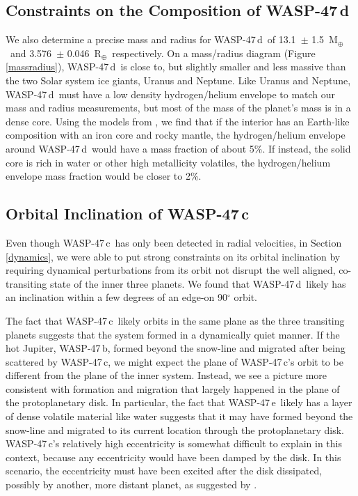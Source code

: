 \documentclass{emulateapj}
\newcommand{\Spitzer}{{\it Spitzer}}
\newcommand{\thisfirstplanet}{WASP-47\,b}
\newcommand{\thissecondplanet}{WASP-47\,e}
\newcommand{\thisthirdplanet}{WASP-47\,d}
\newcommand{\thisfourthplanet}{WASP-47\,c}
\newcommand{\mearth}{M$_\oplus$}
\newcommand{\rearth}{R$_\oplus$}
\newcommand{\rpld}{3.576}
\newcommand{\urpld}{0.046}
\newcommand{\mpld}{13.1}
\newcommand{\umpld}{1.5}
\begin{document}

\subsection{Constraints on the Composition of \thisthirdplanet}

We also determine a precise mass and radius for \thisthirdplanet\ of \mpld\ $\pm$ \umpld\ \mearth\ and \rpld\ $\pm$ \urpld\ \rearth\, respectively. On a mass/radius diagram (Figure \ref{massradius}), \thisthirdplanet\ is close to, but slightly smaller and less massive than the two Solar system ice giants, Uranus and Neptune. Like Uranus and Neptune, \thisthirdplanet\ must have a low density hydrogen/helium envelope to match our mass and radius measurements, but most of the mass of the planet's mass is in a dense core. Using the models from \citet{lopezsubneptunes}, we find that if the interior has an Earth-like composition with an iron core and rocky mantle, the hydrogen/helium envelope around \thisthirdplanet\ would have a mass fraction of about 5\%. If instead, the solid core is rich in water or other high metallicity volatiles, the hydrogen/helium envelope mass fraction would be closer to 2\%. 

\subsection{Orbital Inclination of \thisfourthplanet}

Even though \thisfourthplanet\ has only been detected in radial velocities, in Section \ref{dynamics}, we were able to put strong constraints on its orbital inclination by requiring dynamical perturbations from its orbit not disrupt the well aligned, co-transiting state of the inner three planets. We found that \thisthirdplanet\ likely has an inclination within a few degrees of an edge-on 90$^\circ$ orbit.

The fact that \thisfourthplanet\ likely orbits in the same plane as the three transiting planets suggests that the system formed in a dynamically quiet manner. If the hot Jupiter, \thisfirstplanet, formed beyond the snow-line and migrated after being scattered by \thisfourthplanet, we might expect the plane of \thisfourthplanet's orbit to be different from the plane of the inner system. Instead, we see a picture more consistent with formation and migration that largely happened in the plane of the protoplanetary disk. In particular, the fact that \thissecondplanet\ likely has a layer of dense volatile material like water suggests that it may have formed beyond the snow-line and migrated to its current location through the protoplanetary disk. \thisfourthplanet's relatively high eccentricity is somewhat difficult to explain in this context, because any eccentricity would have been damped by the disk. In this scenario, the eccentricity must have been excited after the disk dissipated, possibly by another, more distant planet, as suggested by \citet{weissw47}.
\end{document}
